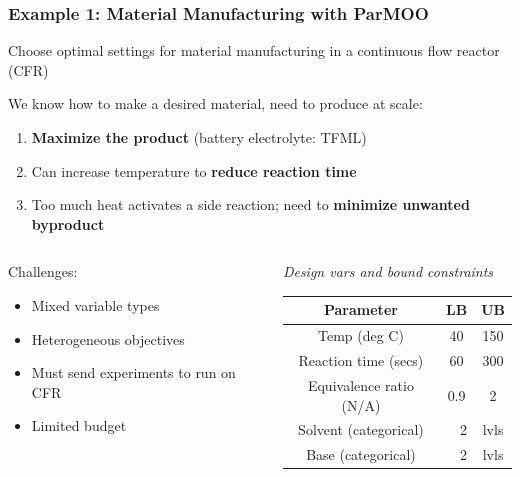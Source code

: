 \documentclass[aspectratio=169]{beamer}
\begin{document}
\begin{frame}\frametitle{Example 1: Material Manufacturing with ParMOO}
Choose optimal settings for material manufacturing in a
continuous flow reactor (CFR)

\bigskip

We know how to make a desired material, need to produce at scale:

\begin{enumerate}
\item {\color{green} \bf Maximize the product} (battery electrolyte: TFML)
\item Can increase temperature to {\bf \color{red} reduce reaction time}
\item Too much heat activates a side reaction; need to
{\bf \color{blue} minimize unwanted byproduct}
\end{enumerate}

\bigskip
\begin{columns}
\begin{column}{0.5\textwidth}
Challenges:

\begin{itemize}
\item Mixed variable types
\item Heterogeneous objectives
\item Must send experiments to run on CFR
\item Limited budget
\end{itemize}
\end{column}
\begin{column}{0.5\textwidth}
  {\small
  {\sl Design vars and bound constraints}

  \smallskip

      \begin{tabular}{c|cc}
      Parameter & LB & UB \\
      \hline
       Temp (deg C) & 40 & 150 \\
       Reaction time (secs) & 60 & 300 \\
       Equivalence ratio (N/A) & 0.9 & 2 \\
      \hline
       Solvent (categorical) & $\quad$2 & lvls \\
       Base (categorical) & $\quad$2 & lvls \\
  \end{tabular}
  }
\end{column}
\end{columns}
\end{frame}
\end{document}
